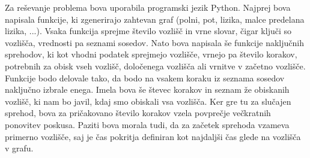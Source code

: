 \documentclass[12pt,a4paper]{amsart}
\begin{document}
Za reševanje problema bova uporabila programski jezik Python. Najprej bova napisala funkcije, ki zgenerirajo zahtevan
graf (polni, pot, lizika, malce predelana lizika, ...). Vsaka funkcija sprejme število vozlišč in vrne slovar, čigar
ključi so vozlišča, vrednosti pa seznami sosedov. Nato bova napisala še funkcije naključnih sprehodov, ki kot
vhodni podatek sprejmejo vozlišče, vrnejo pa število korakov, potrebnih za obisk vseh vozlišč, določenega vozlišča
ali vrnitve v začetno vozlišče. Funkcije bodo delovale tako, da bodo na vsakem koraku iz seznama sosedov naključno
izbrale enega. Imela bova še števec korakov in seznam že obiskanih vozlišč, ki nam bo javil, kdaj smo obiskali vsa
vozlišča. Ker gre tu za slučajen sprehod, bova za pričakovano število korakov vzela povprečje večkratnih ponovitev
poskusa. Paziti bova morala tudi, da za začetek sprehoda vzameva primerno vozlišče, saj je čas pokritja definiran kot
najdaljši čas glede na vozlišča v grafu.
\end{document}
